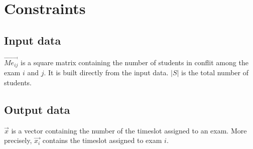 \section*{Constraints}
\subsection*{Input data}
$ \vec{Me_{ij}} $ is a square matrix containing the number of students in conflit among the exam $i$ and $j$. It is built directly from the input data.
\newline
$ |S| $ is the total number of students.

\subsection*{Output data}
$ \vec{x} $ is a vector containing the number of the timeslot assigned to an exam. More precisely, $ \vec{x_{i}} $ contains the timeslot assigned to exam $i$.